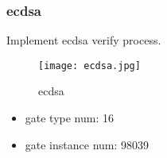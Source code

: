 \subsubsection{ecdsa}

Implement ecdsa verify process.

\begin{figure}[!ht]
    \centering
    \texttt{[image: ecdsa.jpg]}
    \caption{ecdsa}
    \label{fig:ecdsa}
\end{figure}

\begin{itemize}
    \item gate type num: 16
    \item gate instance num: 98039
\end{itemize}
